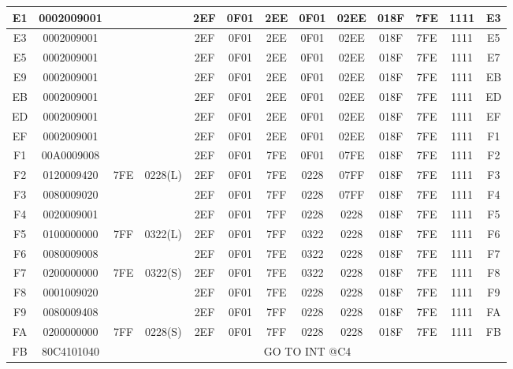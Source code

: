 {\begin{flushleft}
\begin{tabular}{|c|c|c|c|c|c|c|c|c|c|c|c|c|}
            E1       & 0002009001 &       &          & 2EF & 0F01 & 2EE & 0F01 & 02EE & 018F & 7FE & 1111 & E3 \\
            \hline
            E3       & 0002009001 &       &          & 2EF & 0F01 & 2EE & 0F01 & 02EE & 018F & 7FE & 1111 & E5 \\
            \hline
            E5       & 0002009001 &       &          & 2EF & 0F01 & 2EE & 0F01 & 02EE & 018F & 7FE & 1111 & E7 \\
            \hline
            E9       & 0002009001 &       &          & 2EF & 0F01 & 2EE & 0F01 & 02EE & 018F & 7FE & 1111 & EB \\
            \hline
            EB       & 0002009001 &       &          & 2EF & 0F01 & 2EE & 0F01 & 02EE & 018F & 7FE & 1111 & ED \\
            \hline
            ED       & 0002009001 &       &          & 2EF & 0F01 & 2EE & 0F01 & 02EE & 018F & 7FE & 1111 & EF \\
            \hline
            EF       & 0002009001 &       &          & 2EF & 0F01 & 2EE & 0F01 & 02EE & 018F & 7FE & 1111 & F1 \\
            \hline
            F1       & 00A0009008 &       &          & 2EF & 0F01 & 7FE & 0F01 & 07FE & 018F & 7FE & 1111 & F2 \\
            \hline
            F2       & 0120009420 & 7FE   & 0228(L)  & 2EF & 0F01 & 7FE & 0228 & 07FF & 018F & 7FE & 1111 & F3 \\
            \hline
            F3       & 0080009020 &       &          & 2EF & 0F01 & 7FF & 0228 & 07FF & 018F & 7FE & 1111 & F4 \\
            \hline
            F4       & 0020009001 &       &          & 2EF & 0F01 & 7FF & 0228 & 0228 & 018F & 7FE & 1111 & F5 \\
            \hline
            F5       & 0100000000 & 7FF   & 0322(L)  & 2EF & 0F01 & 7FF & 0322 & 0228 & 018F & 7FE & 1111 & F6 \\
            \hline
            F6       & 0080009008 &       &          & 2EF & 0F01 & 7FE & 0322 & 0228 & 018F & 7FE & 1111 & F7 \\
            \hline
            F7       & 0200000000 & 7FE   & 0322(S)  & 2EF & 0F01 & 7FE & 0322 & 0228 & 018F & 7FE & 1111 & F8 \\
            \hline
            F8       & 0001009020 &       &          & 2EF & 0F01 & 7FE & 0228 & 0228 & 018F & 7FE & 1111 & F9 \\
            \hline
            F9       & 0080009408 &       &          & 2EF & 0F01 & 7FF & 0228 & 0228 & 018F & 7FE & 1111 & FA \\
            \hline
            FA       & 0200000000 & 7FF   & 0228(S)  & 2EF & 0F01 & 7FF & 0228 & 0228 & 018F & 7FE & 1111 & FB \\
            \hline
            FB & 80C4101040 & \multicolumn{11}{1}{GO TO INT @C4} \\
            \hline

        \end{tabular}
    \end{flushleft}
}
\newpage

